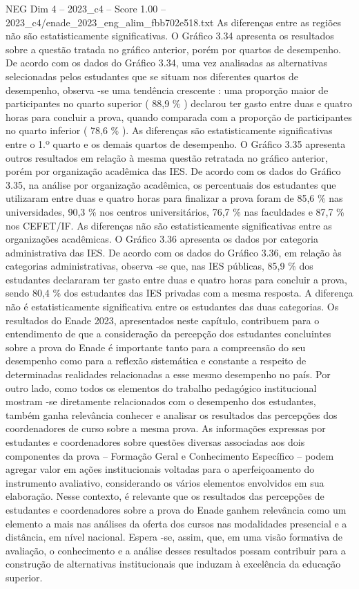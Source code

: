 \begin{textsample}{NEG Dim 4 – 2023\_c4 – Score 1.00 – 2023\_c4/enade\_2023\_eng\_alim\_fbb702e518.txt}
As diferenças entre as regiões não são estatisticamente significativas.
O Gráfico 3.34 apresenta os resultados sobre a questão tratada no gráfico anterior, porém por quartos de desempenho.
De acordo com os dados do Gráfico 3.34, uma vez analisadas as alternativas selecionadas pelos estudantes que se situam nos diferentes quartos de desempenho, observa -se uma tendência crescente : uma proporção maior de participantes no quarto superior ( 88,9 \% ) declarou ter gasto entre duas e quatro horas para concluir a prova, quando comparada com a proporção de participantes no quarto inferior ( 78,6 \% ).
As diferenças são estatisticamente significativas entre o 1.º quarto e os demais quartos de desempenho.
O Gráfico 3.35 apresenta outros resultados em relação à mesma questão retratada no gráfico anterior, porém por organização acadêmica das IES.
De acordo com os dados do Gráfico 3.35, na análise por organização acadêmica, os percentuais dos estudantes que utilizaram entre duas e quatro horas para finalizar a prova foram de 85,6 \% nas universidades, 90,3 \% nos centros universitários, 76,7 \% nas faculdades e 87,7 \% nos CEFET/IF.
As diferenças não são estatisticamente significativas entre as organizações acadêmicas.
O Gráfico 3.36 apresenta os dados por categoria administrativa das IES.
De acordo com os dados do Gráfico 3.36, em relação às categorias administrativas, observa -se que, nas IES públicas, 85,9 \% dos estudantes declararam ter gasto entre duas e quatro horas para concluir a prova, sendo 80,4 \% dos estudantes das IES privadas com a mesma resposta.
A diferença não é estatisticamente significativa entre os estudantes das duas categorias.
Os resultados do Enade 2023, apresentados neste capítulo, contribuem para o entendimento de que a consideração da percepção dos estudantes concluintes sobre a prova do Enade é importante tanto para a compreensão do seu desempenho como para a reflexão sistemática e constante a respeito de determinadas realidades relacionadas a esse mesmo desempenho no país.
Por outro lado, como todos os elementos do trabalho pedagógico institucional mostram -se diretamente relacionados com o desempenho dos estudantes, também ganha relevância conhecer e analisar os resultados das percepções dos coordenadores de curso sobre a mesma prova.
As informações expressas por estudantes e coordenadores sobre questões diversas associadas aos dois componentes da prova – Formação Geral e Conhecimento Específico – podem agregar valor em ações institucionais voltadas para o aperfeiçoamento do instrumento avaliativo, considerando os vários elementos envolvidos em sua elaboração.
Nesse contexto, é relevante que os resultados das percepções de estudantes e coordenadores sobre a prova do Enade ganhem relevância como um elemento a mais nas análises da oferta dos cursos nas modalidades presencial e a distância, em nível nacional.
Espera -se, assim, que, em uma visão formativa de avaliação, o conhecimento e a análise desses resultados possam contribuir para a construção de alternativas institucionais que induzam à excelência da educação superior.

\end{textsample}
